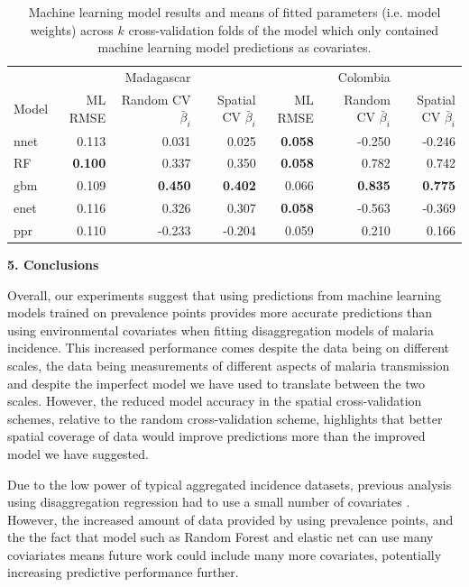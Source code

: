 \documentclass[11pt]{article}
\begin{document}
\begin{table}
\caption{Machine learning model results and means of fitted parameters (i.e. model weights) across $k$ cross-validation folds of the model which only contained machine learning model predictions as covariates. }
\centering
\small
\begin{tabular}{l|rrr|rrr}
               &&      Madagascar &&      &                                     Colombia&    \\
Model          & ML RMSE & Random CV $\bar{\beta}_i$ & Spatial CV $\bar{\beta}_i$  & ML RMSE & Random CV $\bar{\beta}_i$  & Spatial CV $\bar{\beta}_i$  \\
\hline
nnet           & 0.113      &  0.031         &  0.025         & \textbf{0.058}& -0.250          & -0.246          \\
RF   &  \textbf{0.100}      &  0.337         &  0.350         & \textbf{0.058}&  0.782          &  0.742          \\
gbm            & 0.109      &  \textbf{0.450}&  \textbf{0.402}& 0.066         &  \textbf{0.835} &  \textbf{0.775} \\
enet           & 0.116      &  0.326         &  0.307         & \textbf{0.058}& -0.563          & -0.369          \\
ppr            & 0.110      & -0.233         & -0.204         & 0.059         &  0.210          &  0.166          \\
\end{tabular}
\label{t:mlresults}
\end{table}




{\bf 5. Conclusions}

Overall, our experiments suggest that using predictions from machine learning models trained on prevalence points provides more accurate predictions than using environmental covariates when fitting disaggregation models of malaria incidence.
This increased performance comes despite the data being on different scales, the data being measurements of different aspects of malaria transmission and despite the imperfect model we have used to translate between the two scales.
However, the reduced model accuracy in the spatial cross-validation schemes, relative to the random cross-validation scheme, highlights that better spatial coverage of data would improve predictions more than the improved model we have suggested.


Due to the low power of typical aggregated incidence datasets, previous analysis using disaggregation regression had to use a small number of covariates \citep{sturrock2014fine}.
However, the increased amount of data provided by using prevalence points, and the the fact that model such as Random Forest and elastic net can use many coviariates means future work could include many more covariates, potentially increasing predictive performance further.
\end{document}
